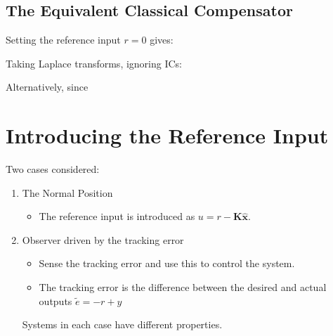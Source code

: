 

\subsection*{The Equivalent Classical Compensator} %
\label{sec:the_equivalent_classical_compensator}



\ifslidesonly
\begin{slide}
	
\end{slide}
\fi


Setting the reference input $r = 0$  gives:

\ifslidesonly
\begin{slide}
   
\end{slide}
\fi

Taking Laplace transforms, ignoring ICs:

\ifslidesonly
\begin{slide}
   
\end{slide}
\fi


Alternatively, since

\ifslidesonly
\begin{slide}
   
\end{slide}
\fi

\ifslidesonly
\begin{slide}
   
\end{slide}
\fi




 
\section*{Introducing the Reference Input} %
\label{sec:introducing_the_reference_input}

\ifslidesonly
\begin{slide}
Two cases considered:
\begin{enumerate}
	\item The Normal Position
	\begin{itemize}
		\item The reference input is introduced as $u=r-\mathbf{K}\hat{\mathbf{x}}$.
	\end{itemize}
	\item Observer driven by the tracking error
	\begin{itemize}
		\item Sense the tracking error and use this to control the system.
		\item The tracking error is the difference between the desired and actual outputs $\tilde e =  - r + y$
	\end{itemize}
	Systems in each case have different properties.
\end{enumerate}
   
\end{slide}
\fi
